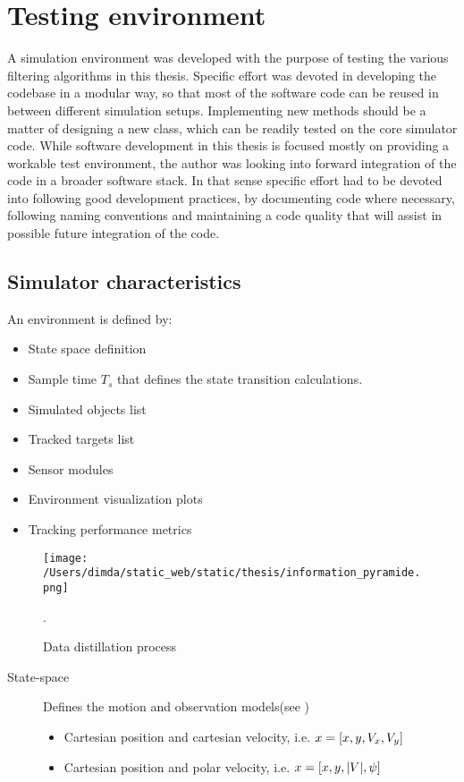 
\chapter{Testing environment }

A simulation environment was developed with the purpose of testing the various filtering algorithms in this thesis. Specific effort was devoted in developing the codebase in a modular way, so that most of the software code can be reused in between different simulation setups. Implementing new methods should be a matter of designing a new class, which can be readily tested on the core simulator code. While software development in this thesis is focused mostly on providing a workable test environment, the author was looking into forward integration of the code in a broader software stack. In that sense specific effort had to be devoted into following good development practices, by documenting code where necessary, following naming conventions and maintaining a code quality that will assist in possible future integration of the code.


\section{Simulator characteristics}

An environment is defined by:
\begin{itemize}
	\item State space definition 
	\item Sample time $T_s$ that defines the state transition calculations.
	\item Simulated objects list
	\item Tracked targets list
	\item Sensor modules
	\item Environment visualization plots
	\item Tracking performance metrics
\end{itemize}


\begin{figure}[H]
	\centering
	\texttt{[image: /Users/dimda/static\_web/static/thesis/information\_pyramide.png]}
	\caption{Data distillation process}.
	\label{fig:information_pyramide}
\end{figure}


\begin{description}
	\item[State-space] Defines the motion and observation models(see )
	\begin{itemize}
		\item Cartesian position and cartesian velocity, i.e. $ x=[x,y,{V}_x, {V}_y] $
		\item Cartesian position and polar velocity, i.e. $ x = [x,y,|{V}|,{\psi}]$
	\end{itemize}
\end{description}

